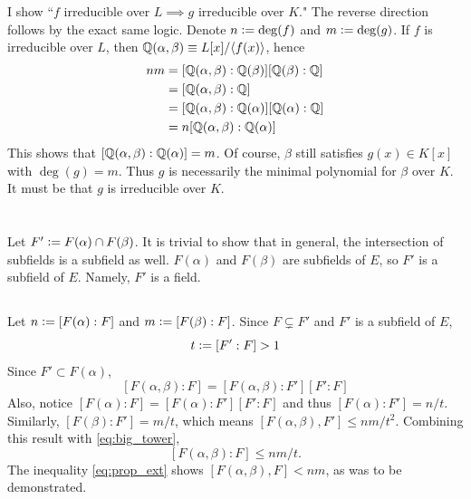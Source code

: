 \documentclass[12pt]{article}
\begin{document}
\section{}
I show ``$f$ irreducible over $L \implies g$ irreducible over $K$." 
The reverse direction follows by the exact same logic. 
Denote $n \vcentcolon= \deg(f)$ and $m \vcentcolon= \deg(g)$. 
If $f$ is irreducible over $L$, then $\Q(\alpha, \beta) \equiv L[x] / \<f(x)\>$, hence 
\begin{align*}
  nm & = [\mathbb{Q}(\alpha, \beta) : \mathbb{Q}(\beta)][\mathbb{Q}(\beta) : \mathbb{Q}] \\ 
     & = [\mathbb{Q}(\alpha, \beta) : \mathbb{Q}] \\ 
     & = [\mathbb{Q}(\alpha, \beta) : \mathbb{Q}(\alpha)][\mathbb{Q}(\alpha) : \mathbb{Q}] \\ 
     & = n [\mathbb{Q}(\alpha, \beta) : \mathbb{Q}(\alpha)]
\end{align*}
This shows that $[\mathbb{Q}(\alpha, \beta) : \mathbb{Q}(\alpha)] = m$. 
Of course, $\beta$ still satisfies $g(x) \in K[x]$ with $\deg(g) = m$.
Thus $g$ is necessarily the minimal polynomial for $\beta$ over $K$. 
It must be that $g$ is irreducible over $K$. 

\section{} 
\subsection{} 
Let $F' \vcentcolon= F(\alpha) \cap F(\beta)$. 
It is trivial to show that in general, the intersection of subfields is a subfield as well. 
$F(\alpha)$ and $F(\beta)$ are subfields of $E$, so $F'$ is a subfield of $E$. 
Namely, $F'$ is a field. 

\subsection{}
Let $n \vcentcolon= [F(\alpha) : F]$ and $m \vcentcolon= [F(\beta) : F]$. 
Since $F \subsetneq F'$ and $F'$ is a subfield of $E$, 
\begin{equation} \label{eq:prop_ext}
  t \vcentcolon= [F' : F] > 1
\end{equation}
Since $F' \subset F(\alpha)$, 
\begin{equation} \label{eq:big_tower}
  [F(\alpha, \beta) : F] = [F(\alpha, \beta) : F'] [F' : F]
\end{equation}
Also, notice $[F(\alpha) : F] = [F(\alpha) : F'] [F' : F]$ and thus $[F(\alpha) : F'] = n / t$. 
Similarly, $[F(\beta) : F'] = m / t$, which means $[F(\alpha, \beta), F'] \leq nm / t^2$. 
Combining this result with \eqref{eq:big_tower},
$$[F(\alpha, \beta) : F] \leq nm / t.$$ 
The inequality \eqref{eq:prop_ext} shows $[F(\alpha, \beta), F] < nm$, as was to be demonstrated.  
\end{document}
